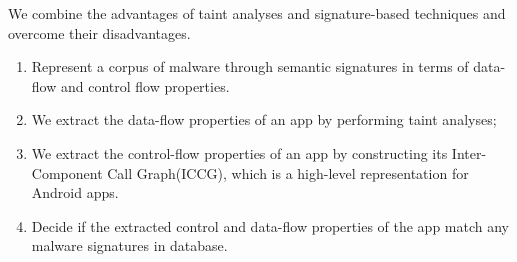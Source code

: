 \documentclass[landscape,final,a0paper,fontscale=0.285]{baposter}
\newcommand{\compresslist}{%
\setlength{\itemsep}{1pt}%
\setlength{\parskip}{0pt}%
\setlength{\parsep}{0pt}%
}
\begin{document}
\begin{poster}
{ We combine the advantages of taint analyses and signature-based techniques and overcome their disadvantages.
   \begin{enumerate}\compresslist
   \item Represent a corpus of malware through semantic signatures in terms of data-flow and control flow properties.
   \item We extract the data-flow properties of an app by performing taint analyses;
   \item We extract the control-flow properties of an app by constructing its Inter-Component Call Graph(ICCG), which is a high-level representation for Android apps.
   \item Decide if the extracted control and data-flow properties of the app match any malware signatures in database.
   \end{enumerate}
 
  }

\end{poster}
\end{document}

